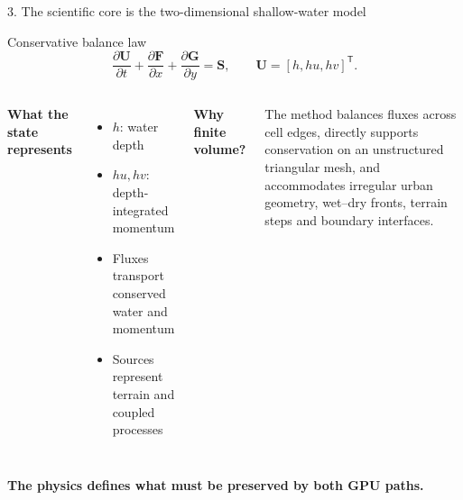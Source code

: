 \documentclass[aspectratio=169,10pt]{beamer}
\newcommand{\tightitem}{\setlength\itemsep{2pt}\setlength\parskip{0pt}}
\begin{document}
\begin{frame}{3. The scientific core is the two-dimensional shallow-water model}
\small
\begin{block}{Conservative balance law}
\[
\frac{\partial\bm U}{\partial t}+\frac{\partial\bm F}{\partial x}
+\frac{\partial\bm G}{\partial y}=\bm S,
\qquad \bm U=[h,hu,hv]^{\mathsf T}.
\]
\end{block}

\begin{columns}[T,onlytextwidth]
\textbf{What the state represents}
\begin{itemize}\tightitem
\item $h$: water depth
\item $hu,hv$: depth-integrated momentum
\item Fluxes transport conserved water and momentum
\item Sources represent terrain and coupled processes
\end{itemize}
\textbf{Why finite volume?}

The method balances fluxes across cell edges, directly supports conservation on an
unstructured triangular mesh, and accommodates irregular urban geometry, wet--dry fronts,
terrain steps and boundary interfaces.
\end{columns}

\vspace{3mm}
\centering\color{hfblue}\bfseries The physics defines what must be preserved by both GPU paths.
\end{frame}
\end{document}
